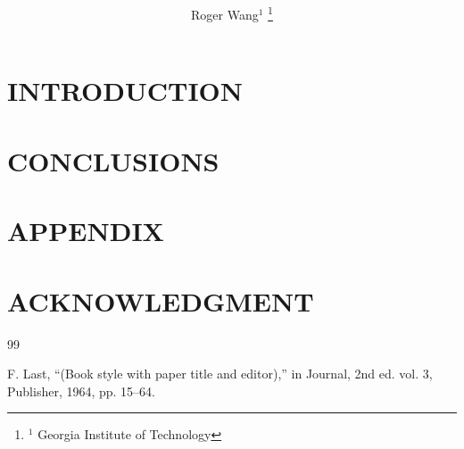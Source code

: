 \documentclass[letterpaper, 10 pt, conference]{ieeeconf}  %
\title{\LARGE \bf

}
\author{Roger Wang$^{1}$%
\thanks{$^{1}$ Georgia Institute of Technology}%
}
\begin{document}
\maketitle
\thispagestyle{empty}
\pagestyle{empty}

\begin{abstract}


\end{abstract}


\section{INTRODUCTION}


\section{CONCLUSIONS}


\addtolength{\textheight}{-12cm}   %

\section*{APPENDIX}

\section*{ACKNOWLEDGMENT}

\begin{thebibliography}{99}

 F. Last, ``(Book style with paper title and editor),'' in Journal, 2nd ed. vol. 3,  Publisher, 1964, pp. 15--64.

\end{thebibliography}
\end{document}
